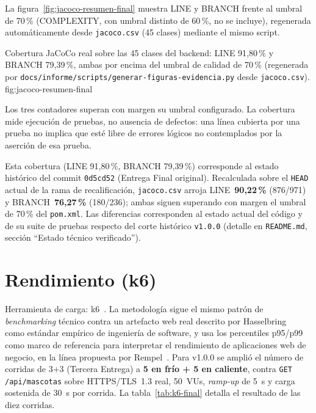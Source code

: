 La figura~\ref{fig:jacoco-resumen-final} muestra LINE y BRANCH frente al
umbral de 70\,\% (COMPLEXITY, con umbral distinto de 60\,\%, no se
incluye), regenerada autom\'aticamente desde \texttt{jacoco.csv} (45
clases) mediante el mismo script.

%
{Cobertura JaCoCo real sobre las 45 clases del backend: LINE 91{,}80\,\% y BRANCH 79{,}39\,\%, ambas por encima del umbral de calidad de 70\,\% (regenerada por \texttt{docs/informe/scripts/generar-figuras-evidencia.py} desde \texttt{jacoco.csv}).}%
{fig:jacoco-resumen-final}

Los tres contadores superan con margen su umbral configurado. La cobertura
mide ejecuci\'on de pruebas, no ausencia de defectos: una l\'inea cubierta
por una prueba no implica que est\'e libre de errores l\'ogicos no
contemplados por la aserci\'on de esa prueba.

Esta cobertura (LINE 91{,}80\,\%, BRANCH 79{,}39\,\%) corresponde al
estado hist\'orico del commit \texttt{0d5cd52} (Entrega Final original).
Recalculada sobre
el \texttt{HEAD} actual de la rama de recalificaci\'on, \texttt{jacoco.csv}
arroja LINE~\textbf{90{,}22\,\%} (876/971) y BRANCH~\textbf{76{,}27\,\%}
(180/236); ambas siguen superando con margen el umbral de 70\,\% del
\texttt{pom.xml}. Las diferencias corresponden al estado actual del
c\'odigo y de su suite de pruebas respecto del corte hist\'orico
\texttt{v1.0.0} (detalle en \texttt{README.md}, secci\'on ``Estado
t\'ecnico verificado'').

\section{Rendimiento (k6)}
\label{sec:rendimiento-final}

Herramienta de carga: k6~\cite{k6-docs}. La metodolog\'ia sigue el mismo
patr\'on de \emph{benchmarking} t\'ecnico contra un artefacto web real
descrito por Hasselbring~\cite{hasselbring2021benchmarking} como est\'andar
emp\'irico de ingenier\'ia de software, y usa los percentiles p95/p99 como
marco de referencia para interpretar el rendimiento de aplicaciones web
de negocio, en la l\'inea propuesta por Rempel~\cite{rempel2015webperf}.
Para v1.0.0 se ampli\'o el n\'umero de corridas de 3+3 (Tercera Entrega) a
\textbf{5 en fr\'io + 5 en caliente}, contra \texttt{GET /api/mascotas}
sobre HTTPS/TLS~1.3 real, 50~VUs, \emph{ramp-up} de 5~s y carga sostenida
de 30~s por corrida. La tabla~\ref{tab:k6-final} detalla el resultado de
las diez corridas.

